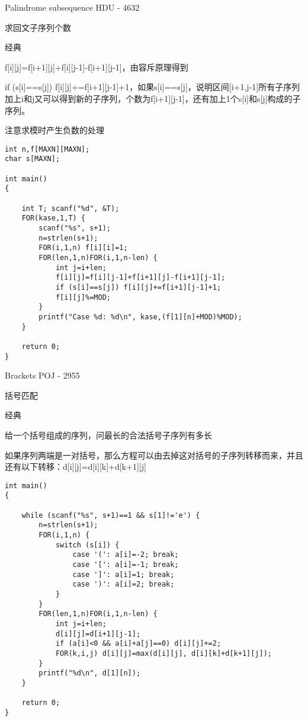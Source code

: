 Palindrome subsequence HDU - 4632

求回文子序列个数

经典

f[i][j]=f[i+1][j]+f[i][j-1]-f[i+1][j-1]，由容斥原理得到

if (s[i]==s[j]) f[i][j]+=f[i+1][j-1]+1，如果s[i]==s[j]，说明区间[i+1,j-1]所有子序列加上i和j又可以得到新的子序列，个数为f[i+1][j-1]，还有加上1个s[i]和s[j]构成的子序列。

注意求模时产生负数的处理

\begin{lstlisting}
int n,f[MAXN][MAXN];
char s[MAXN];

int main()
{

    int T; scanf("%d", &T);
    FOR(kase,1,T) {
        scanf("%s", s+1);
        n=strlen(s+1);
        FOR(i,1,n) f[i][i]=1;
        FOR(len,1,n)FOR(i,1,n-len) {
            int j=i+len;
            f[i][j]=f[i][j-1]+f[i+1][j]-f[i+1][j-1];
            if (s[i]==s[j]) f[i][j]+=f[i+1][j-1]+1;
            f[i][j]%=MOD;
        }
        printf("Case %d: %d\n", kase,(f[1][n]+MOD)%MOD);
    }

    return 0;
}
\end{lstlisting}

Brackets POJ - 2955

括号匹配

经典

给一个括号组成的序列，问最长的合法括号子序列有多长

如果序列两端是一对括号，那么方程可以由去掉这对括号的子序列转移而来，并且还有以下转移：d[i][j]=d[i][k]+d[k+1][j]

\begin{lstlisting}
int main()
{

    while (scanf("%s", s+1)==1 && s[1]!='e') {
        n=strlen(s+1);
        FOR(i,1,n) {
            switch (s[i]) {
                case '(': a[i]=-2; break;
                case '[': a[i]=-1; break;
                case ']': a[i]=1; break;
                case ')': a[i]=2; break;
            }
        }
        FOR(len,1,n)FOR(i,1,n-len) {
            int j=i+len;
            d[i][j]=d[i+1][j-1];
            if (a[i]<0 && a[i]+a[j]==0) d[i][j]+=2;
            FOR(k,i,j) d[i][j]=max(d[i][j], d[i][k]+d[k+1][j]);
        }
        printf("%d\n", d[1][n]);
    }

    return 0;
}
\end{lstlisting}